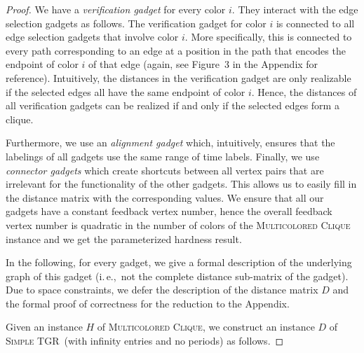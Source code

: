 \documentclass[a4paper,UKenglish,cleveref, autoref, thm-restate, anonymous]{lipics-v2021}
\newcommand{\ie}{i.\,e.,\ }
\newcommand{\deltaExact}{\textsc{Simple TGR}}
\begin{document}
\begin{proof}
 We have a \emph{verification gadget} for every color $i$. They interact with the edge selection gadgets as follows.
 The verification gadget for color $i$ is connected to all edge selection gadgets that involve color $i$. More specifically, this is connected to every path corresponding to an edge at a position in the path that encodes the endpoint of color $i$ of that edge (again, see Figure~3 in the Appendix for reference). Intuitively, the distances in the verification gadget are only realizable if the selected edges all have the same endpoint of color $i$.
Hence, the distances of all verification gadgets can be realized if and only if the selected edges form a clique. 

Furthermore, we use an \emph{alignment gadget} which, intuitively, ensures that the labelings of all gadgets use the same range of time labels. Finally, we use \emph{connector gadgets} which create shortcuts between all vertex pairs that are irrelevant for the functionality of the other gadgets. This allows us to easily fill in the distance matrix with the corresponding values.
We ensure that all our gadgets have a constant feedback vertex number, hence the overall feedback vertex number is quadratic in the number of colors of the \textsc{Multicolored Clique} instance and we get the parameterized hardness result.

In the following, for every gadget, we give a formal description of the underlying graph of this gadget (\ie not the complete distance sub-matrix of the gadget). Due to space constraints, we defer the description of the distance matrix $D$ and the formal proof of correctness for the reduction to the Appendix.

    Given an instance $H$ of \textsc{Multicolored Clique}, we construct an instance $D$ of \deltaExact\ (with infinity entries and no periods) as follows. 
    

\end{proof}
\end{document}
